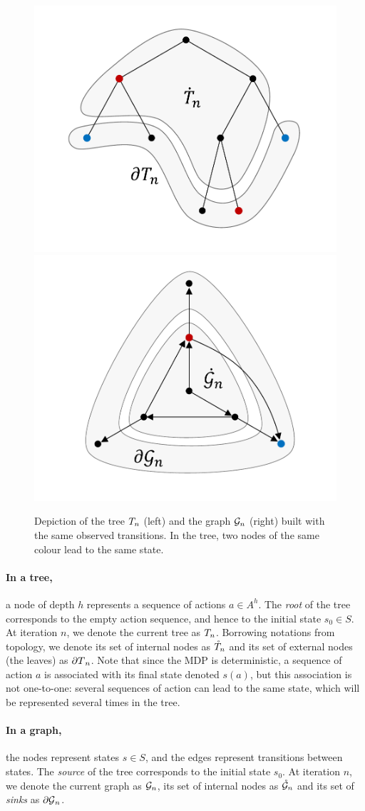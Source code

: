 \documentclass[runningheads]{llncs}
\begin{document}
\begin{figure}[tp]
	\centering
	\includegraphics[trim={1.8cm 1.2cm 1.9cm 1.2cm}, clip,width=0.44\linewidth]{img/tree_1}
	\hfill
	\includegraphics[trim={1.8cm 1.2cm 1.9cm 0.9cm}, clip,width=0.44\linewidth]{img/graph_1}
	\caption{Depiction of the tree $T_n$ (left) and the graph $\mathcal{G}_n$ (right) built with the same observed transitions. In the tree, two nodes of the same colour lead to the same state.}
	\label{fig:structures}
\end{figure}

\paragraph{In a tree,} a node of depth $h$ represents a sequence of actions $a\in A^h$. The \textit{root} of the tree corresponds to the empty action sequence, and hence to the initial state $s_0\in S$. At iteration $n$, we denote the current tree as $T_n$. Borrowing notations from topology, we denote its set of internal nodes as $\mathring{T}_n$ and its set of external nodes (the leaves) as ${\partial T}_n$. Note that since the MDP is deterministic, a sequence of action $a$ is associated with its final state denoted $s(a)$, but this association is not one-to-one: several sequences of action can lead to the same state, which will be represented several times in the tree.

\paragraph{In a graph,} the nodes represent states $s\in S$, and the edges represent transitions between states. The \textit{source} of the tree corresponds to the initial state $s_0$. At iteration $n$, we denote the current graph as $\mathcal{G}_n$, its set of internal nodes as $\mathring{\mathcal{G}}_n$ and its set of \textit{sinks} as ${\partial \mathcal{G}}_n$.
\end{document}
